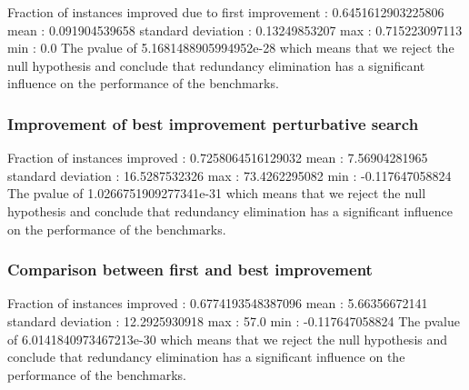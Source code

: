\documentclass[a4paper,12pt]{article}
\begin{document}
Fraction of instances improved due to first improvement :  0.6451612903225806
mean : 0.091904539658
standard deviation : 0.13249853207
max : 0.715223097113
min : 0.0
The pvalue of 5.1681488905994952e-28 which means that we reject the null hypothesis and conclude that redundancy elimination has a significant influence on the performance of the benchmarks.

\subsubsection{Improvement of best improvement perturbative search}

Fraction of instances improved :  0.7258064516129032
mean : 7.56904281965
standard deviation : 16.5287532326
max : 73.4262295082
min : -0.117647058824
The pvalue of 1.0266751909277341e-31 which means that we reject the null hypothesis and conclude that redundancy elimination has a significant influence on the performance of the benchmarks.

\subsubsection{Comparison between first and best improvement}
Fraction of instances improved :  0.6774193548387096
mean : 5.66356672141
standard deviation : 12.2925930918
max : 57.0
min : -0.117647058824
The pvalue of 6.0141840973467213e-30 which means that we reject the null hypothesis and conclude that redundancy elimination has a significant influence on the performance of the benchmarks.


\end{document}
